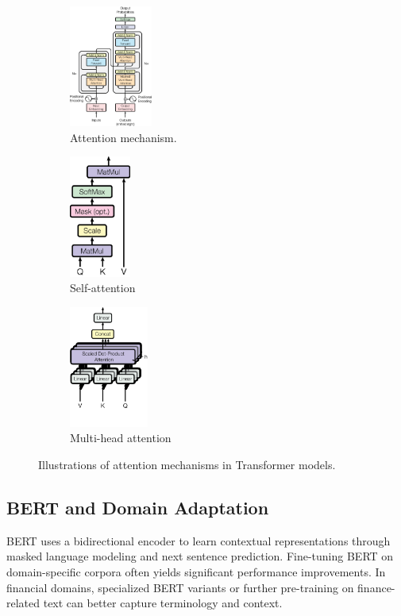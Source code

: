 \documentclass[12pt]{article}
\begin{document}
\begin{figure}[H]
	\centering
	\begin{subfigure}[b]{0.32\textwidth}
		\centering
		\includegraphics[height=4cm]{attention.png}
		\caption{Attention mechanism.}
	\end{subfigure}
	\hfill
	\begin{subfigure}[b]{0.32\textwidth}
		\centering
		\includegraphics[height=4cm]{self_attention_mechanism.png}
		\caption{Self-attention}
	\end{subfigure}
	\hfill
	\begin{subfigure}[b]{0.32\textwidth}
		\centering
		\includegraphics[height=4cm]{multihead_attention.png}
		\caption{Multi-head attention}
	\end{subfigure}
	\caption{Illustrations of attention mechanisms in Transformer models.}
	\label{fig:attention_mechanisms}
\end{figure}

\subsection{BERT and Domain Adaptation}
BERT \cite{ref2} uses a bidirectional encoder to learn contextual representations through masked language modeling and next sentence prediction. Fine-tuning BERT on domain-specific corpora often yields significant performance improvements. In financial domains, specialized BERT variants or further pre-training on finance-related text can better capture terminology and context.
\end{document}
